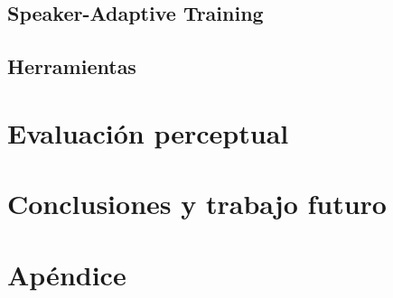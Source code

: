 \documentclass[11pt,a4paper,twoside]{tesis}
\begin{document}
\section{Speaker-Adaptive Training}\label{speakerAdaptativeTraining}


\section{Herramientas} \label{herramientas}

\chapter{Evaluación perceptual}\label{evaluacionPerceptual}




\chapter{Conclusiones y trabajo futuro}


\pagebreak
\chapter{Apéndice}


\backmatter
%
\end{document}
